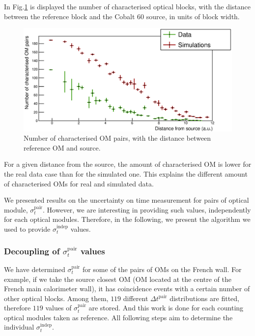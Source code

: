 In Fig.\ref{fig:Co_sigma_distance} is displayed the number of characterised optical blocks, with the distance between the reference block and the Cobalt $60$ source, in units of block width.
\begin{figure}[h]
  \centering
  \includegraphics[width=15cm]{commissioning/fig_commissioning/Co_sigma_distance.eps}
  \caption{Number of characterised OM pairs, with the distance between reference OM and source.
    \label{fig:Co_sigma_distance}}
\end{figure}
For a given distance from the source, the amount of characterised OM is lower for the real data case than for the simulated one.
This explains the different amount of characterised OMs for real and simulated data.
\newline

We presented results on the uncertainty on time measurement for pairs of optical module, $\sigma_{t}^{\text{pair}}$.
However, we are interesting in providing such values, independently for each optical modules.
Therefore, in the following, we present the algorithm we used to provide $\sigma_{t}^{\text{indep}}$ values.




\subsubsection*{Decoupling of $\sigma_{t}^{\text{pair}}$ values}

We have determined $\sigma_{t}^{\text{pair}}$ for some of the pairs of OMs on the French wall.
For example, if we take the source closest OM (OM located at the centre of the French main calorimeter wall), it has coincidence events with a certain number of other optical blocks.
Among them, $119$ different $\Delta t^{\text{pair}}$ distributions are fitted, therefore $119$ values of $\sigma_{t}^{\text{pair}}$ are stored.
And this work is done for each counting optical modules taken as reference.
All following steps aim to determine the individual $\sigma_{t}^{\text{indep}}$.

